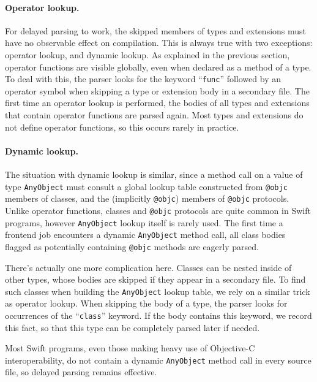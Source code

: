 \documentclass[../generics]{subfiles}
\begin{document}
\paragraph{Operator lookup.}
For delayed parsing to work, the skipped members of types and extensions must have no observable effect on compilation. This is always true with two exceptions: operator lookup, and dynamic lookup. As explained in the previous section, operator functions are visible globally, even when declared as a method of a type. To deal with this, the parser looks for the keyword ``\texttt{func}'' followed by an operator symbol when skipping a type or extension body in a secondary file. The first time an operator lookup is performed, the bodies of all types and extensions that contain operator functions are parsed again. Most types and extensions do not define operator functions, so this occurs rarely in practice.

\paragraph{Dynamic  lookup.}
The situation with dynamic lookup is similar, since a method call on a value of type \texttt{AnyObject} must consult a global lookup table constructed from \texttt{@objc} members of classes, and the (implicitly \texttt{@objc}) members of \texttt{@objc} protocols.  Unlike operator functions, classes and \texttt{@objc} protocols are quite common in Swift programs, however \texttt{AnyObject} lookup itself is rarely used. The first time a frontend job encounters a dynamic \texttt{AnyObject} method call, all class bodies flagged as potentially containing \texttt{@objc} methods are eagerly parsed.

There's actually one more complication here. Classes can be nested inside of other types, whose bodies are skipped if they appear in a secondary file. To find such classes when building the \texttt{AnyObject} lookup table, we rely on a similar trick as operator lookup. When skipping the body of a type, the parser looks for occurrences of the ``\texttt{class}'' keyword. If the body contains this keyword, we record this fact, so that this type can be completely parsed later if needed.

Most Swift programs, even those making heavy use of Objective-C interoperability, do not contain a dynamic \texttt{AnyObject} method call in every source file, so delayed parsing remains effective.
\end{document}

